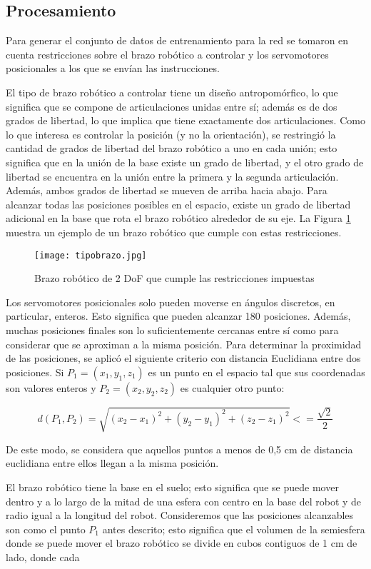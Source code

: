 \subsection{Procesamiento}

Para generar el conjunto de datos de entrenamiento para la red se tomaron en cuenta restricciones sobre el brazo robótico a controlar y los servomotores posicionales a los que se envían las instrucciones.

El tipo de brazo robótico a controlar tiene un diseño antropomórfico, lo que significa que se compone de articulaciones unidas entre sí; además es de dos grados de libertad, lo que implica que tiene exactamente dos articulaciones. Como lo que interesa es controlar la posición (y no la orientación), se restringió la cantidad de grados de libertad del brazo robótico a uno en cada unión; esto significa que en la unión de la base existe un grado de libertad, y el otro grado de libertad se encuentra en la unión entre la primera y la segunda articulación. Además, ambos grados de libertad se mueven de arriba hacia abajo. Para alcanzar todas las posiciones posibles en el espacio, existe un grado de libertad adicional en la base que rota el brazo robótico alrededor de su eje. La Figura \ref{fig:tipobrazo} muestra un ejemplo de un brazo robótico que cumple con estas restricciones.

\begin{figure}[htb]
	\centering
	\texttt{[image: tipobrazo.jpg]}
	\caption{Brazo robótico de 2 DoF que cumple las restricciones impuestas}
	\label{fig:tipobrazo}
\end{figure}

Los servomotores posicionales solo pueden moverse en ángulos discretos, en particular, enteros. Esto significa que pueden alcanzar 180 posiciones. Además, muchas posiciones finales son lo suficientemente cercanas entre sí como para considerar que se aproximan a la misma posición.  Para determinar la proximidad de las posiciones, se aplicó el siguiente criterio con distancia Euclidiana entre dos posiciones. Si $P_1 = (x_1, y_1, z_1)$ es un punto en el espacio tal que sus coordenadas son valores enteros y $P_2 = (x_2, y_2, z_2)$ es cualquier otro punto:

\begin{equation}
	d(P_1, P_2) = \sqrt{(x_2 - x_1)^2 + (y_2 - y_1)^2 + (z_2 - z_1)^2} <= \frac{\sqrt{2}}{2}
\end{equation}

De este modo, se considera que aquellos puntos a menos de 0,5 cm de distancia euclidiana entre ellos llegan a la misma posición. 

El brazo robótico tiene la base en el suelo; esto significa que se puede mover dentro y a lo largo de la mitad de una esfera con centro en la base del robot y de radio igual a la longitud del robot. Consideremos que las posiciones alcanzables son como el punto $P_1$ antes descrito; esto significa que el volumen de la semiesfera donde se puede mover el brazo robótico se divide en cubos contiguos de 1 cm de lado, donde cada 